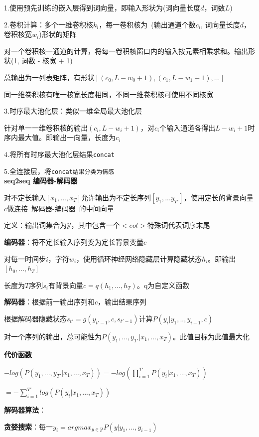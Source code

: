 \documentclass[UTF8]{ctexart}
\begin{document}
  \quad 1.使用预先训练的嵌入层得到词向量，即输入形状为(词向量长度$d$，词数$L$)

  \quad 2.卷积计算：多个一维卷积核$k_i$，每一卷积核为\ (输出通道个数$c_i$, 词向量长度$d$，卷积核宽$w_i$)形状的矩阵

  \quad \quad 对一个卷积核一通道的计算，将每一卷积核窗口内的输入按元素相乘求和。输出形状(1, 词数 - 核宽 + 1)

  \quad \quad 总输出为一列表矩阵，有形状$[(c_0, L - w_0 + 1), (c_1, L - w_1 + 1), ...]$

  \quad \quad 同一维卷积核有唯一核宽长度相同，不同一维卷积核可使用不同核宽

  \quad 3.时序最大池化层：类似一维全局最大池化层
  
  \quad \quad 针对单一一维卷积核的输出$(c_i, L - w_i + 1)$，对$c_i$个输入通道各得出$L - w_i + 1$时序内最大值。即输出一向量，长度为$c_i$
  
  \quad 4.将所有时序最大池化层结果\texttt{concat}

  \quad 5.全连接层，将\texttt{concat结果分类为情感}\\
\textbf{seq2seq 编码器-解码器}

  对不定长输入$[x_1, ..., x_T]$允许输出为不定长序列$[y_1,...y_{T'}]$，使用定长的背景向量$c$做连接\ 解码器-编码器\ 的中间向量

  定义：输出词集合为$\mathcal{Y} $，其中包含一个$<eol>$特殊词代表词序末尾

  \textbf{编码器}：将不定长输入序列变为定长背景变量$c$

  \quad 对每一时间步$i$，字符$w_i$，使用循环神经网络隐藏层计算隐藏状态$h_i$。即输出$[h_0, ..., h_T]$

  \quad 长度为$T$序列$s_i$有背景向量$c = q(h_1, ..., h_T)$。q为自定义函数

  \textbf{解码器}：根据前一输出序列和$c$，输出结果序列

  \quad 根据解码器隐藏状态$s_{t'} = g(y_{t'-1}, c, s_{t'-1})$计算$P(y_i | y_{1}, .., y_{i-1}, c)$
  
  \quad 对一个序列的输出，总可能性为$ P(y_1,...,y_{T'} | x_1, ..., x_T)$。此值目标为此值最大化

  \textbf{代价函数}

  \quad $-log(P(y_1,...,y_{T'} | x_1, ..., x_T)) = -log(\prod_{i=1}^{T'} P(y_i | x_1, ..., x_T))$

  \quad \quad $ = -\sum_{i=1}^{T'}log(P(y_i | x_1, ..., x_T))$
  
  \textbf{解码器算法}：

  \quad \textbf{贪婪搜索}：每一$y_i = argmax_{y\in \mathcal{Y} }P(y|y_1, ..., y_{i-1})$
\end{document}
